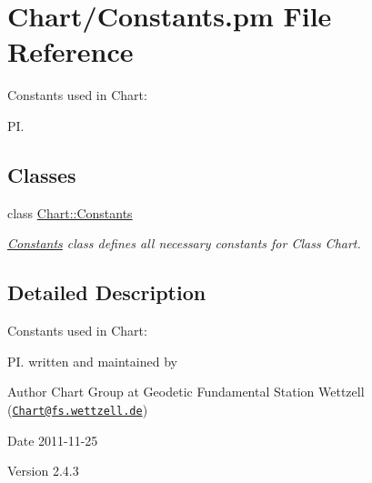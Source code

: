 \hypertarget{Constants_8pm}{
\section{Chart/Constants.pm File Reference}
\label{Constants_8pm}
}


Constants used in Chart:\par
 PI.  


\subsection*{Classes}
\begin{DoxyCompactItemize}
\item 
class \hyperlink{classChart_1_1Constants}{Chart::Constants}
\begin{DoxyCompactList}\small\item\em \hyperlink{classChart_1_1Constants}{Constants} class defines all necessary constants for Class Chart. \item\end{DoxyCompactList}\end{DoxyCompactItemize}


\subsection{Detailed Description}
Constants used in Chart:\par
 PI. written and maintained by \begin{DoxyAuthor}{Author}
Chart Group at Geodetic Fundamental Station Wettzell (\href{mailto:Chart@fs.wettzell.de}{\tt Chart@fs.wettzell.de}) 
\end{DoxyAuthor}
\begin{DoxyDate}{Date}
2011-\/11-\/25 
\end{DoxyDate}
\begin{DoxyVersion}{Version}
2.4.3 
\end{DoxyVersion}
